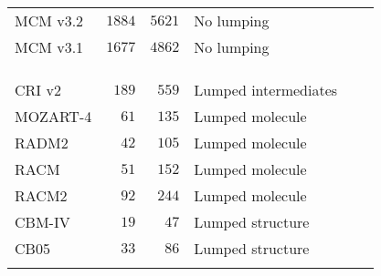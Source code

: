 \documentclass[acpd, online, hvmath]{copernicus}
\providecommand{\DIFaddendFL}{} %
\begin{document}
\begin{table}[t]
{\begin{tabular}{lrrlll}
\middlehline
        MCM v3.2 &$1884$ &$5621$ &No lumping &\citet{MCM_Site} &\citet{Koss:2015} \\
        {MCM v3.1} &{$1677$} &{$4862$} &{No lumping} &\citet{Jenkin:1997} &\citet{Lidster:2014} \\
        &&&&\citet{Saunders:2003} & \\
        &&&&\citet{Jenkin:2003} & \\
        &&&&\citet{Bloss:2005} & \\
        CRI v2 &$189$ &$559$ &Lumped intermediates &\citet{Jenkin:2008} &\citet{Derwent:2015} \\
        MOZART-4 &$61$ &$135$ &Lumped molecule &\citet{Emmons:2010} &\citet{Hou:2015}\\
        RADM2 &$42$ &$105$ &Lumped molecule &\citet{Stockwell:1990} &\citet{Li:2014}\\
        RACM &$51$ &$152$ &Lumped molecule &\citet{Stockwell:1997} &\citet{Ahmadov:2015}\\
        RACM2 &$92$ &$244$ &Lumped molecule &\citet{Goliff:2013} &\citet{Goliff:2015}\\
        CBM-IV &$19$ &$47$ &Lumped structure &\citet{Gery:1989} &\citet{Foster:2014}\\
        CB05 &$33$ &$86$ &Lumped structure &\citet{Yarwood:2005} &\citet{Dunker:2015}\\
        \bottomhline
    \end{tabular}}
\DIFaddendFL \label{t:mechanisms}
\end{table}
\end{document}
